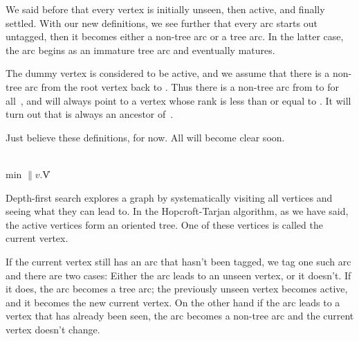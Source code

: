 We said before that every vertex is initially unseen, then active, and
finally settled. With our new definitions, we see further that every arc starts
out untagged, then it becomes either a non-tree arc or a tree arc. In the
latter case, the arc begins as an immature tree arc and eventually matures.

The dummy vertex is considered to be active, and we assume that
there is a non-tree arc from the root vertex back to . Thus
there is a non-tree arc from  to  for all~, and 
will always point to a vertex whose rank is less than or equal to
. It will turn out that 
is always an ancestor
of~.

Just believe these definitions, for now. All will become clear soon.

\Y\B\4\D\\{min}\5
$\|v.{}$\|V\par
\fi

Depth-first search explores a graph by systematically visiting all
vertices and seeing what they can lead to. In the Hopcroft-Tarjan algorithm, as
we have said, the active vertices form an oriented tree. One of these
vertices is called the current vertex.

If the current vertex still has an arc that hasn't been tagged, we
tag one such arc and there are two cases: Either the arc leads to
an unseen vertex, or it doesn't. If it does, the arc becomes a tree
arc; the previously unseen vertex becomes active, and it becomes the
new current vertex.  On the other hand if the arc leads to a vertex
that has already been seen, the arc becomes a non-tree arc and the
current vertex doesn't change.

